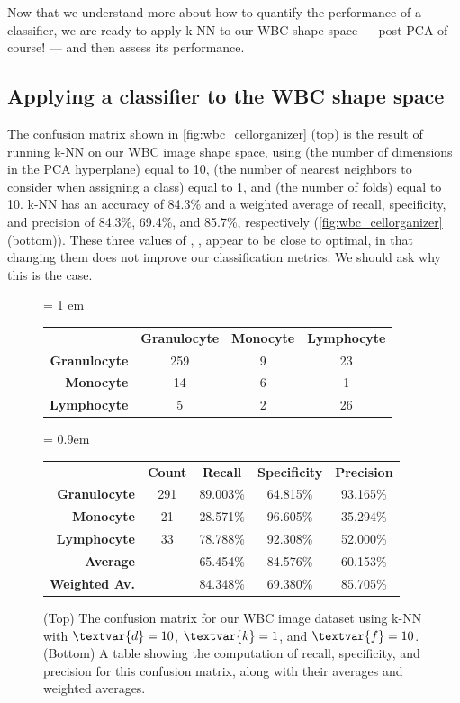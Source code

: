 Now that we understand more about how to quantify the performance of a classifier, we are ready to apply k-NN to our WBC shape space --- post-PCA of course! --- and then assess its performance.

\FloatBarrier
{}
\subsection{Applying a classifier to the WBC shape space}

The confusion matrix shown in \autoref{fig:wbc_cellorganizer} (top) is the result of running k-NN on our WBC image shape space, using  (the number of dimensions in the PCA hyperplane) equal to 10,  (the number of nearest neighbors to consider when assigning a class) equal to 1, and  (the number of folds) equal to 10. k-NN has an accuracy of 84.3\% and a weighted average of recall, specificity, and precision of 84.3\%, 69.4\%, and 85.7\%, respectively (\autoref{fig:wbc_cellorganizer} (bottom)). These three values of , ,  appear to be close to optimal, in that changing them does not improve our classification metrics. We should ask why this is the case.\\

\begin{figure}[h]
\centering
\tabcolsep = 1 em
\mySfFamily
\begin{tabular}{r c c c}
\rowcolor{gray!50}
& \textbf{Granulocyte} & \textbf{Monocyte} & \textbf{Lymphocyte} \\
\textbf{Granulocyte} & 259 & 9 & 23 \\
\textbf{Monocyte} & \phantom{5}14 & 6 & \phantom{5}1 \\
 \textbf{Lymphocyte} & \phantom{55}5 & 2 & 26
\end{tabular}

\phantom{Test}\vspace{\baselineskip}

\tabcolsep = 0.9em
\begin{tabular}{r c c c c}
\rowcolor{gray!50}
& \textbf{Count} & \textbf{Recall} & \textbf{Specificity} & \textbf{Precision} \\
\textbf{Granulocyte} & 291 & 89.003\% & 64.815\% & 93.165\%\\
\textbf{Monocyte} & 21 & 28.571\% & 96.605\% & 35.294\% \\
\textbf{Lymphocyte} & 33 & 78.788\% & 92.308\% & 52.000\%\\
\textbf{Average} & & 65.454\% & 84.576\% & 60.153\%\\
\textbf{Weighted Av.} & & 84.348\% & 69.380\% & 85.705\%\\
\end{tabular}
\caption{(Top) The confusion matrix for our WBC image dataset using k-NN with $\textvar{d} = \text{10}$, $\textvar{k} = \text{1}$, and $\textvar{f} = \text{10}$. (Bottom) A table showing the computation of recall, specificity, and precision for this confusion matrix, along with their averages and weighted averages.}
\label{fig:wbc_cellorganizer}
\end{figure}

